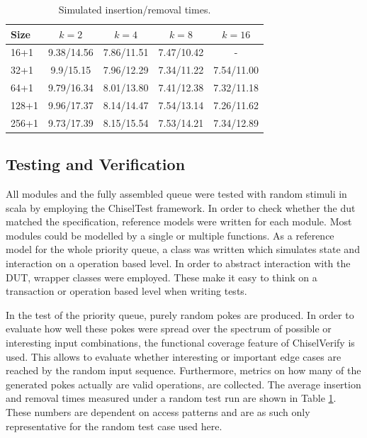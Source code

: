 \documentclass[runningheads]{llncs}
\begin{document}
\begin{table}[]
  \centering
  \begin{tabular}{l|cccc}
      Size &$k=2$&$k=4$&$k=8$&$k=16$\\\hline
      16+1 & 9.38/14.56&7.86/11.51&7.47/10.42&-\\
      32+1 & 9.9/15.15&7.96/12.29&7.34/11.22&7.54/11.00\\
      64+1 & 9.79/16.34&8.01/13.80&7.41/12.38&7.32/11.18\\
      128+1 & 9.96/17.37&8.14/14.47&7.54/13.14&7.26/11.62\\
      256+1 & 9.73/17.39&8.15/15.54&7.53/14.21&7.34/12.89
  \end{tabular}
  \label{tab:pq_simres}
  \caption{Simulated insertion/removal times.}
\end{table}



\subsection{Testing and Verification}

All modules and the fully assembled queue were tested with random stimuli in scala by employing the ChiselTest framework.
In order to check whether the dut matched the specification, reference models were written for each module. Most modules 
could be modelled by a single or multiple functions. As a reference model for the whole priority queue, a class 
was written which simulates state and interaction on a operation based level. In order to abstract interaction with the DUT,
wrapper classes were employed. These make it easy to think on a transaction or 
operation based level when writing tests.

In the test of the priority queue, purely random pokes are produced. In order to evaluate how well these pokes were spread over the spectrum 
of possible or interesting input combinations, the functional coverage feature of ChiselVerify is used. This allows to evaluate whether interesting 
or important edge cases are reached by the random input sequence. Furthermore, metrics on how many of the generated pokes actually are valid 
operations, are collected. The average insertion and removal times measured under a random test run are shown in Table \ref{tab:pq_simres}.
These numbers are dependent on access patterns and are as such only representative for the random test case used here.
\end{document}
